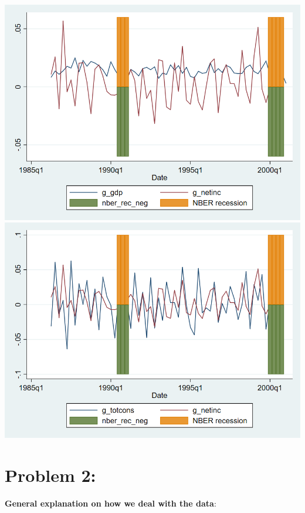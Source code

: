 \documentclass[12pt,a4paper]{article}
\begin{document}
\begin{center}
\includegraphics[width=14cm]{graphs/inc_gdp.png}\\
\includegraphics[width=14cm]{graphs/inc_cons.png}\\
\end{center}


\section*{Problem 2: }

\textbf{General explanation on how we deal with the data}:
\end{document}
